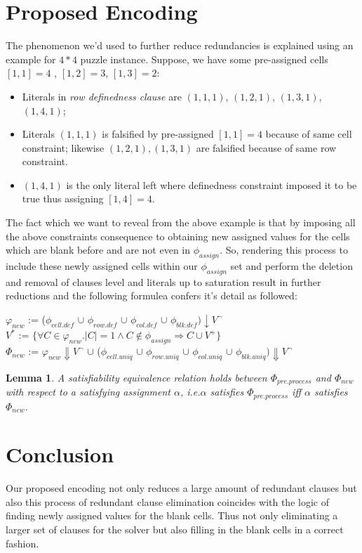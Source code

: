 \documentclass[letterpaper]{article}
\newtheorem{lemma}[definition]{Lemma}
\begin{document}
\section{Proposed Encoding}
\noindent The phenomenon we'd used to further reduce redundancies is explained using an example for $4\ast4$ puzzle instance. Suppose, we have some pre-assigned cells $[1,1]=4$ , $[1,2]=3$, $[1,3]=2$:
\begin{itemize}
\item Literals in  \textit{row definedness clause} are $(1,1,1)$, $(1,2,1)$, $(1,3,1)$, $(1,4,1)$;
\item Literals $(1,1,1)$ is falsified by pre-assigned $[1,1]=4$ because of same cell constraint; likewise $(1,2,1),(1,3,1)$ are falsified because of same row constraint.
\item $(1,4,1)$ is the only literal left where definedness constraint imposed it to be true thus assigning $[1,4]=4$.
\end{itemize}

The fact which we want to reveal from the above example is that by imposing all the above constraints consequence to obtaining new assigned values for the cells which are blank before and are not even in $\phi_{assign}$. So, rendering this process to include these newly assigned cells within our $\phi_{assign}$ set and perform the deletion and removal of clauses level and literals up to saturation result in further reductions and the following formulea confers it's detail as followed: 

$\varphi_{new}$ := ($\phi_{cell.def}$ $\cup$ $\phi_{row.def}$ $\cup$ $\phi_{col.def}$ $\cup$ $\phi_{blk.def})\downarrow V^{\neg}$\\
$V^{*}$ := $\{ \forall C \in \varphi_{new} . |C| = 1 \wedge C \not\in \phi_{assign} \Rightarrow C \cup V^{+} \}$\\
$\Phi_{new}$ := $\varphi_{new}\Downarrow V^{\neg}$ $\cup$
($\phi_{cell.uniq}$ $\cup$ $\phi_{row.uniq}$ $\cup$ $\phi_{col.uniq}$ $\cup$ $\phi_{blk.uniq})\Downarrow V^{\neg}$\\

\begin{lemma}
\label{lemma:Satisfiablity}
A satisfiability equivalence relation holds between $\Phi_{pre.process}$ and $\Phi_{new}$ with respect to a satisfying assignment $\alpha$, i.e.$\alpha$ satisfies $\Phi_{pre.process}$ iff $\alpha$ satisfies $\Phi_{new}$.
\end{lemma}

\section{Conclusion}
Our proposed encoding not only reduces a large amount of redundant clauses but also this process of redundant clause elimination coincides with the logic of finding newly assigned values for the blank cells. Thus not only eliminating a larger set of clauses for the solver but also filling in the blank cells in a correct fashion.


\end{document}
